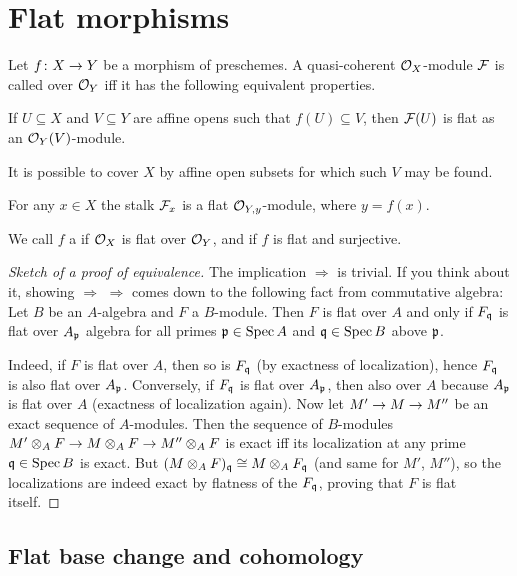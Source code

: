\documentclass[a4paper,parskip=half,numbers=enddot, DIV=12]{scrreprt}
\begin{document}
\chapter{Flat morphisms}
\begin{defi}
	Let $f\colon X\morphism Y$ be a morphism of preschemes. A quasi-coherent $\mathcal{O}_X$-module $\mathcal{F}$ is called  over $\mathcal{O}_Y$ iff it has the following equivalent properties.
	\begin{alphanumerate}
		\item If $U\subseteq X$ and $V\subseteq Y$ are affine opens such that $f(U)\subseteq V$, then $\mathcal{F}(U)$ is flat as an $\mathcal{O}_Y(V)$-module.
		\item It is possible to cover $X$ by affine open subsets for which such $V$ may be found.
		\item For any $x\in X$ the stalk $\mathcal{F}_x$ is a flat $\mathcal{O}_{Y,y}$-module, where $y=f(x)$.
	\end{alphanumerate}
	We call $f$ a  if $\mathcal{O}_X$ is flat over $\mathcal{O}_Y$, and  if $f$ is flat and surjective.
\end{defi}
\begin{proof}[Sketch of a proof of equivalence]
	The implication  $\Rightarrow$  is trivial. If you think about it, showing  $\Rightarrow$  $\Rightarrow$  comes down to the following fact from commutative algebra: Let $B$ be an $A$-algebra and $F$ a $B$-module. Then $F$ is flat over $A$ and only if $F_{\mathfrak{q}}$ is flat over $A_{\mathfrak{p}}$ algebra for all primes $\mathfrak{p}\in\operatorname{Spec} A$ and $\mathfrak{q}\in\operatorname{Spec} B$ above $\mathfrak{p}$.
	
	Indeed, if $F$ is flat over $A$, then so is $F_{\mathfrak{q}}$ (by exactness of localization), hence $F_{\mathfrak{q}}$ is also flat over $A_{\mathfrak{p}}$. Conversely, if $F_{\mathfrak{q}}$ is flat over $A_{\mathfrak{p}}$, then also over $A$ because $A_{\mathfrak{p}}$ is flat over $A$ (exactness of localization again). Now let $M'\morphism M\morphism M''$ be an exact sequence of $A$-modules. Then the sequence of $B$-modules $M'\otimes_AF\morphism M\otimes_AF\morphism M''\otimes_AF$ is exact iff its localization at any prime $\mathfrak{q}\in \operatorname{Spec} B$ is exact. But $(M\otimes_AF)_{\mathfrak{q}}\cong M\otimes_AF_{\mathfrak{q}}$ (and same for $M'$, $M''$), so the localizations are indeed exact by flatness of the $F_{\mathfrak{q}}$, proving that $F$ is flat itself.
\end{proof}
\section{Flat base change and cohomology}
\end{document}
